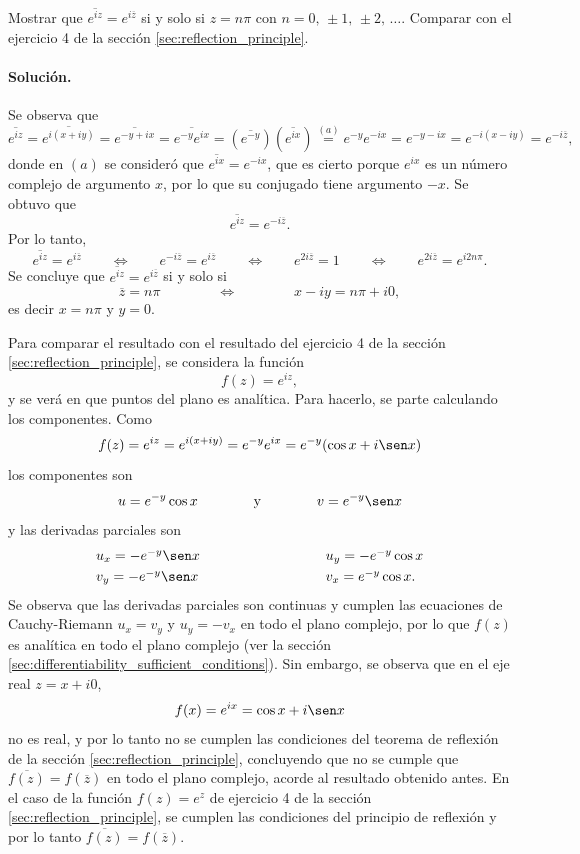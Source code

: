 \documentclass[a4paper]{report}
\begin{document}
Mostrar que \(\overline{e^{iz}}=e^{i\overline{z}}\) si y solo si \(z=n\pi\) con \(n=0,\,\pm1,\,\pm2,\,\dots\). Comparar con el ejercicio 4 de la sección \ref{sec:reflection_principle}.

\paragraph{Solución.} Se observa que 
\[
 \overline{e^{iz}}=\overline{e^{i(x+iy)}}=\overline{e^{-y+ix}}=\overline{e^{-y}e^{ix}}=
 (\overline{e^{-y}})(\overline{e^{ix}})\overset{(a)}{=}e^{-y}e^{-ix}=e^{-y-ix}=e^{-i(x-iy)}=e^{-i\overline{z}}, 
\]
donde en \((a)\) se consideró que \(\overline{e^{ix}}=e^{-ix}\), que es cierto porque \(e^{ix}\) es un número complejo de argumento \(x\), por lo que su conjugado tiene argumento \(-x\). Se obtuvo que 
\[
 \overline{e^{iz}}=e^{-i\overline{z}}.
\]
Por lo tanto,
\[
 \overline{e^{iz}}=e^{i\overline{z}}
 \qquad\Leftrightarrow\qquad
 e^{-i\overline{z}}=e^{i\overline{z}}
 \qquad\Leftrightarrow\qquad
 e^{2i\overline{z}}=1
 \qquad\Leftrightarrow\qquad
 e^{2i\overline{z}}=e^{i2n\pi}.
\]
Se concluye que \(\overline{e^{iz}}=e^{i\overline{z}}\) si y solo si
\[
 \overline{z}=n\pi
 \qquad\qquad\Leftrightarrow\qquad\qquad
 x-iy=n\pi+i0,
\]
es decir \(x=n\pi\) y \(y=0\).

Para comparar el resultado con el resultado del ejercicio 4 de la sección \ref{sec:reflection_principle}, se considera la función
\[
 f(z)=e^{iz},
\]
y se verá en que puntos del plano es analítica. Para hacerlo, se parte calculando los componentes. Como
 \[
  f(z)=e^{iz}=e^{i(x+iy)}=e^{-y}e^{ix}=e^{-y}(\cos x+i\sen x)
 \]
 los componentes son 
 \[
  u=e^{-y}\cos x
  \qquad\qquad\textrm{y}\qquad\qquad
  v=e^{-y}\sen x
 \]
 y las derivadas parciales son
 \[
 \begin{array}{ll}
  u_x=-e^{-y}\sen x\qquad\qquad\qquad\qquad&u_y=-e^{-y}\cos x\\[\smallskipamount]
  v_y=-e^{-y}\sen x\qquad\qquad\qquad\qquad&v_x=e^{-y}\cos x.
 \end{array}
 \]
 Se observa que las derivadas parciales son continuas y cumplen las ecuaciones de Cauchy-Riemann \(u_x=v_y\) y \(u_y=-v_x\) en todo el plano complejo, por lo que \(f(z)\) es analítica en todo el plano complejo (ver la sección \ref{sec:differentiability_sufficient_conditions}). Sin embargo, se observa que en el eje real \(z=x+i0\),
 \[
  f(x)=e^{ix}=\cos x+i\sen x
 \]
 no es real, y por lo tanto no se cumplen las condiciones del teorema de reflexión de la sección \ref{sec:reflection_principle}, concluyendo que no se cumple que \(\overline{f(z)}=f(\overline{z})\) en todo el plano complejo, acorde al resultado obtenido antes. En el caso de la función \(f(z)=e^z\) de ejercicio 4 de la sección \ref{sec:reflection_principle}, se cumplen las condiciones del principio de reflexión y por lo tanto \(\overline{f(z)}=f(\overline{z})\).
\end{document}
